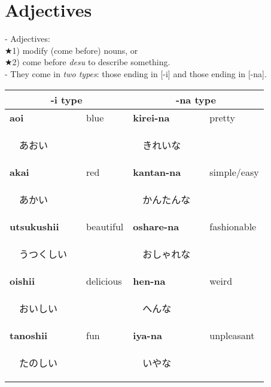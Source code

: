 \documentclass[11pt]{article} %
\newcommand{\ee}{\vspace{.10cm}\\} %
\begin{document}
\section{Adjectives}

- Adjectives:\\
$\bigstar$1) modify (come before) nouns, or \\
$\bigstar$2) come before \textit{desu} to describe something.\ee
- They come in \textit{two types}: those ending in [-i] and those ending in [-na].
\begin{center}
\begin{tabular}{l l | l l}
\multicolumn{2}{c}{-i type}			 & \multicolumn{2}{c}{-na type}\\
\hline
\textbf{aoi} & blue 				& \textbf{kirei-na} & pretty	\\
\begin{CJK}{UTF8}{min}　あおい　\end{CJK} && \begin{CJK}{UTF8}{min}　きれいな　\end{CJK}\\
\textbf{akai} & red 				& \textbf{kantan-na} & simple/easy \\
\begin{CJK}{UTF8}{min}　あかい　\end{CJK} && \begin{CJK}{UTF8}{min}　かんたんな　\end{CJK}\\
\textbf{utsukushii} & beautiful 	& \textbf{oshare-na} & fashionable \\
\begin{CJK}{UTF8}{min}　うつくしい　\end{CJK} && \begin{CJK}{UTF8}{min}　おしゃれな　\end{CJK}\\
\textbf{oishii} & delicious 		& \textbf{hen-na}	& weird\\
\begin{CJK}{UTF8}{min}　おいしい　\end{CJK} && \begin{CJK}{UTF8}{min}　へんな　\end{CJK}\\
\textbf{tanoshii} & fun 			& \textbf{iya-na}	& unpleasant\\
\begin{CJK}{UTF8}{min}　たのしい　\end{CJK} && \begin{CJK}{UTF8}{min}　いやな　\end{CJK}\\

\end{tabular}
\end{center}
\end{document}
